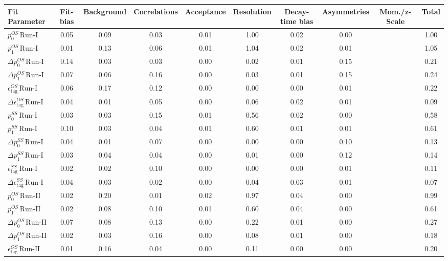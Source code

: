 \begin{tabular}{l  c  c  c  c  c  c  c  c  | c }
\hline
\hline
Fit Parameter & Fit-bias & Background & Correlations & Acceptance & Resolution & Decay-time bias & Asymmetries & Mom./z-Scale &  Total  \\ 
\hline
$p_{0}^{OS} \, \text{Run-I}$ & 0.05 & 0.09 & 0.03 & 0.01 & 1.00 & 0.02 & 0.00 &  & 1.00 \\ 
$p_{1}^{OS} \, \text{Run-I}$ & 0.01 & 0.13 & 0.06 & 0.01 & 1.04 & 0.02 & 0.01 &  & 1.05 \\ 
$\Delta p_{0}^{OS} \, \text{Run-I}$ & 0.14 & 0.03 & 0.03 & 0.00 & 0.02 & 0.01 & 0.15 &  & 0.21 \\ 
$\Delta p_{1}^{OS} \, \text{Run-I}$ & 0.07 & 0.06 & 0.16 & 0.00 & 0.03 & 0.01 & 0.15 &  & 0.24 \\ 
$\epsilon_{\text{tag}}^{OS} \, \text{Run-I}$ & 0.06 & 0.17 & 0.12 & 0.00 & 0.00 & 0.00 & 0.01 &  & 0.22 \\ 
$\Delta \epsilon_{\text{tag}}^{OS} \, \text{Run-I}$ & 0.04 & 0.01 & 0.05 & 0.00 & 0.06 & 0.02 & 0.01 &  & 0.09 \\ 
$p_{0}^{SS} \, \text{Run-I}$ & 0.03 & 0.03 & 0.15 & 0.01 & 0.56 & 0.02 & 0.00 &  & 0.58 \\ 
$p_{1}^{SS} \, \text{Run-I}$ & 0.10 & 0.03 & 0.04 & 0.01 & 0.60 & 0.01 & 0.01 &  & 0.61 \\ 
$\Delta p_{0}^{SS} \, \text{Run-I}$ & 0.04 & 0.01 & 0.07 & 0.00 & 0.00 & 0.00 & 0.10 &  & 0.13 \\ 
$\Delta p_{1}^{SS} \, \text{Run-I}$ & 0.03 & 0.04 & 0.04 & 0.00 & 0.01 & 0.00 & 0.12 &  & 0.14 \\ 
$\epsilon_{\text{tag}}^{SS} \, \text{Run-I}$ & 0.02 & 0.02 & 0.10 & 0.00 & 0.00 & 0.00 & 0.01 &  & 0.11 \\ 
$\Delta \epsilon_{\text{tag}}^{SS} \, \text{Run-I}$ & 0.04 & 0.03 & 0.02 & 0.00 & 0.04 & 0.03 & 0.01 &  & 0.07 \\ 
$p_{0}^{OS} \, \text{Run-II}$ & 0.02 & 0.20 & 0.01 & 0.02 & 0.97 & 0.04 & 0.00 &  & 0.99 \\ 
$p_{1}^{OS} \, \text{Run-II}$ & 0.02 & 0.08 & 0.10 & 0.01 & 0.60 & 0.04 & 0.00 &  & 0.61 \\ 
$\Delta p_{0}^{OS} \, \text{Run-II}$ & 0.07 & 0.08 & 0.13 & 0.00 & 0.22 & 0.01 & 0.00 &  & 0.27 \\ 
$\Delta p_{1}^{OS} \, \text{Run-II}$ & 0.02 & 0.03 & 0.16 & 0.00 & 0.08 & 0.01 & 0.00 &  & 0.18 \\ 
$\epsilon_{\text{tag}}^{OS} \, \text{Run-II}$ & 0.01 & 0.16 & 0.04 & 0.00 & 0.11 & 0.00 & 0.00 &  & 0.20 \\ 

\end{tabular}
